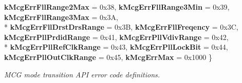 \begin{DoxyCompactItemize}
{\bfseries k\+Mcg\+Err\+Fll\+Range2\+Max} = 0x38, 
{\bfseries k\+Mcg\+Err\+Fll\+Range3\+Min} = 0x39, 
{\bfseries k\+Mcg\+Err\+Fll\+Range3\+Max} = 0x3A, 
\\*
{\bfseries k\+Mcg\+Err\+Fll\+Drst\+Drs\+Range} = 0x3B, 
{\bfseries k\+Mcg\+Err\+Fll\+Freqency} = 0x3C, 
{\bfseries k\+Mcg\+Err\+Pll\+Prdid\+Range} = 0x41, 
{\bfseries k\+Mcg\+Err\+Pll\+Vdiv\+Range} = 0x42, 
\\*
{\bfseries k\+Mcg\+Err\+Pll\+Ref\+Clk\+Range} = 0x43, 
{\bfseries k\+Mcg\+Err\+Pll\+Lock\+Bit} = 0x44, 
{\bfseries k\+Mcg\+Err\+Pll\+Out\+Clk\+Range} = 0x45, 
{\bfseries k\+Mcg\+Err\+Max} = 0x1000
 \}\hypertarget{group__mcg__hal_ga2ab548eca13afeee8091a03bee7a68d0}{}\label{group__mcg__hal_ga2ab548eca13afeee8091a03bee7a68d0}
\begin{DoxyCompactList}\small\item\em M\+CG mode transition A\+PI error code definitions. \end{DoxyCompactList}
\end{DoxyCompactItemize}
